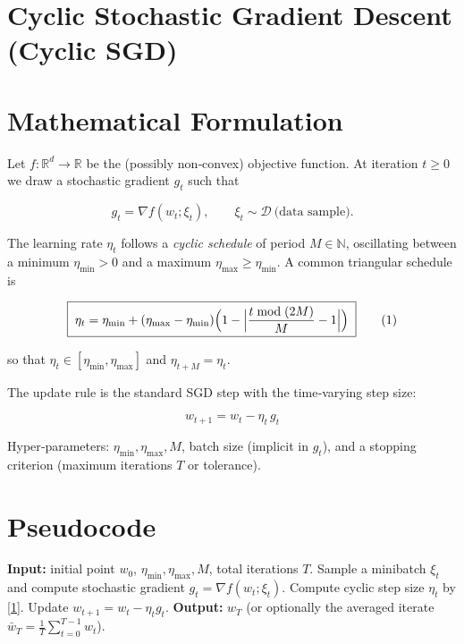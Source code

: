 \documentclass{article}
\newcommand{\R}{\mathbb{R}}
\begin{document}
\section*{Cyclic Stochastic Gradient Descent (Cyclic SGD)}

\section*{Mathematical Formulation}
Let $f:\R^{d}\rightarrow\R$ be the (possibly non‑convex) objective function.  
At iteration $t\ge 0$ we draw a stochastic gradient $g_{t}$ such that  

\[
g_{t}= \nabla f(w_{t};\xi_{t}),\qquad 
\xi_{t}\sim\mathcal{D}\ \text{(data sample)} .
\]

The learning rate $\eta_{t}$ follows a \emph{cyclic schedule} of period $M\in\mathbb{N}$,
oscillating between a minimum $\eta_{\min}>0$ and a maximum $\eta_{\max}\ge\eta_{\min}$.
A common triangular schedule is  

\[
\boxed{\;
\eta_{t}= \eta_{\min}
       +(\eta_{\max}-\eta_{\min})\Bigl(1-
       \Bigl|\frac{t\bmod (2M)}{M}-1\Bigr|\Bigr)
\;}
\tag{1}
\]

so that $\eta_{t}\in[\eta_{\min},\eta_{\max}]$ and $\eta_{t+M}= \eta_{t}$.

The update rule is the standard SGD step with the time‑varying step size:

\[
\boxed{\; w_{t+1}= w_{t}-\eta_{t}\, g_{t}\; } \tag{2}
\]

Hyper‑parameters: $\eta_{\min},\eta_{\max},M$, batch size (implicit in $g_{t}$), and a stopping
criterion (maximum iterations $T$ or tolerance).

\section*{Pseudocode}
\begin{algorithm}[H]
\caption{Cyclic SGD}
\begin{algorithmic}[1]
\State \textbf{Input:} initial point $w_{0}$, $\eta_{\min},\eta_{\max},M$, total iterations $T$.
    \State Sample a minibatch $\xi_{t}$ and compute stochastic gradient $g_{t}= \nabla f(w_{t};\xi_{t})$.
    \State Compute cyclic step size $\eta_{t}$ by \eqref{1}.
    \State Update $w_{t+1}= w_{t}-\eta_{t} g_{t}$.
\EndFor
\State \textbf{Output:} $w_{T}$ (or optionally the averaged iterate $\bar w_T=\frac1T\sum_{t=0}^{T-1} w_t$).
\end{algorithmic}
\end{algorithm}
\end{document}
